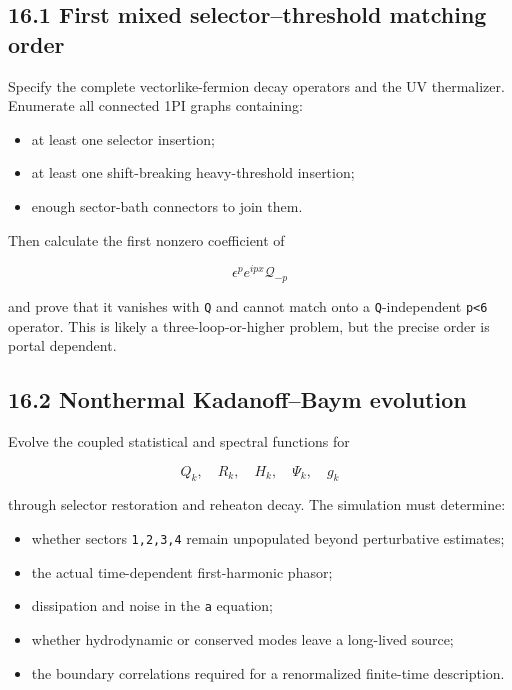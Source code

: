 \documentclass[
  10pt,
  a4paper,
]{article}
\providecommand{\tightlist}{%
  \setlength{\itemsep}{0pt}\setlength{\parskip}{0pt}}
\begin{document}
\subsection{16.1 First mixed selector--threshold matching
order}\label{first-mixed-selectorthreshold-matching-order}

Specify the complete vectorlike-fermion decay operators and the UV
thermalizer. Enumerate all connected 1PI graphs containing:

\begin{itemize}
\tightlist
\item
  at least one selector insertion;
\item
  at least one shift-breaking heavy-threshold insertion;
\item
  enough sector-bath connectors to join them.
\end{itemize}

Then calculate the first nonzero coefficient of

\[
\epsilon^p e^{ipx}\mathcal Q_{-p}
\]

and prove that it vanishes with \texttt{Q} and cannot match onto a
\texttt{Q}-independent \texttt{p\textless{}6} operator. This is likely a
three-loop-or-higher problem, but the precise order is portal dependent.

\subsection{16.2 Nonthermal Kadanoff--Baym
evolution}\label{nonthermal-kadanoffbaym-evolution}

Evolve the coupled statistical and spectral functions for

\[
Q_k,
\quad R_k,
\quad H_k,
\quad\Psi_k,
\quad g_k
\]

through selector restoration and reheaton decay. The simulation must
determine:

\begin{itemize}
\tightlist
\item
  whether sectors \texttt{1,2,3,4} remain unpopulated beyond
  perturbative estimates;
\item
  the actual time-dependent first-harmonic phasor;
\item
  dissipation and noise in the \texttt{a} equation;
\item
  whether hydrodynamic or conserved modes leave a long-lived source;
\item
  the boundary correlations required for a renormalized finite-time
  description.
\end{itemize}
\end{document}
